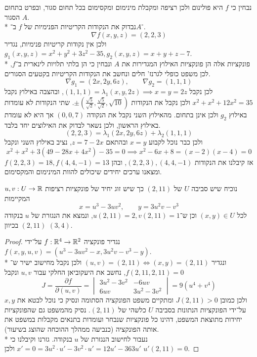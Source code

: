 נבחין כי $f$ היא פולינום ולכן רציפה ומקבלת מינימום ומקסימום בכל תחום סגור, ובפרט בתחום הסגור $A$. \\*
נבדוק את הנקודות הקריטיות הפנימיות של $f$ ב־$A^\circ$.
\[
	\nabla f (x, y, z) = (2, 2, 3)
\]
ולכן אין נקודות קריטיות פנימיות, נגדיר $g_1(x, y, z) = x^2 + y^2 + 3z^2 - 35, g_2(x, y, z) = x + y + z - 7$. \\*
פונקציות אלה הן פונקציות האילוץ המגדירות את $A$ ונבחין כי הן בלתי תלויות לינארית ב־$f$, לכן משפט כופלי לגרנז' חלים ונחשב את הנקודות הקריטיות בקטעים הסגורים.
\[
	\nabla g_1 = (2x, 2y, 6z),
	\qquad
	\nabla g_2 = (1, 1, 1)
\]
לכן נקבל $(1, 1, 1) = \lambda_1 (x, y, 2z) \implies x = y = 2z$, ובהצבה באילוץ נקבל $x^2 + x^2 + 12x^2 = 35$ ולכן נקבל את הנקודות $\pm(\frac{\sqrt{5}}{\sqrt{2}}, \frac{\sqrt{5}}{\sqrt{2}}, \sqrt{10})$.
שתי הנקודות לא עומדות באילוץ $g_2$ ולכן אינן בתחום.
מהאילוץ השני נקבל את הנקודה $(0, 0, 7)$ אך היא לא עומדת באילוץ הראשון, ולכן נשאר לבדוק את האילוצים יחד בלבד.
\[
	(2, 2, 3) = \lambda_1 (2x, 2y, 6z) + \lambda_2 (1, 1, 1)
\]
ולכן כבר נוכל לקבוע $x = y$ ובהתאם $z = 7 - 2x$, נציב באילוץ השני ונקבל
\[
	x^2 + x^2 + 3(49 - 28x + 4x^2) - 35 = 0
	\implies
	x^2 - 6x + 8 = (x - 2)(x - 4) = 0
\]
אז קיבלנו את הנקודות $(2, 2, 3), (4, 4, -1)$, ובהן $f(2, 2, 3) = 18, f(4, 4, -1) = 13$ ומצאנו ערכים יחידים שיכולים להוות המינימום והמקסימום.

\Question{}
נוכיח שיש סביבה $U$ של $(2, 11)$ כך שיש זוג יחיד של פונקציות רציפות $u, v : U \to \mathbb{R}$ המקיימות
\[
	x = u^3 - 3 u v^2,
	\qquad
	y = 3u^2 v - v^3
\]
לכל $(x, y) \in U$ וכן ש־$u(2, 11) = 2, v(2, 11) = 1$, ונמצא את הנגזרת של $u$ בנקודה $(2, 11)$ בכיוון $(3, 4)$.
\begin{proof}
	נגדיר פונקציה $f : \mathbb{R}^{4} \to \mathbb{R}^2$ על־ידי $f(x, y, u, v) = (u^3 - 3uv^2 - x, 3u^2 v - v^3 - y)$. \\*
	ונגדיר $(u, v) = (2, 11) \iff (x, y) = (2, 11)$ ולכן נקבל מחישוב ישיר ש־$f(2, 11, 2, 11) = 0$, נחשב את היעקוביאן החלקי עבור $u, v$ ונקבל
	\[
		J = \frac{\partial f}{\partial (u, v)}
		= \begin{vmatrix}
			3u^2 - 3v^2 & -6uv \\
			6uv & 3u^2 - 3v^2
		\end{vmatrix}
		= 9(u^4 + v^4)
	\]
	ולכן כמובן $J(2, 11) > 0$ ומתקיים משפט הפונקציה הסתומה ונסיק כי נוכל לבטא את $x, y$ על־ידי הפונקציות הנתונות בסביבה $U$ כלשהי של $(2, 11)$.
	נסיק מהמשפט גם שהפונקציות יחידות מתוצאת המשפט, דהינו כל פונקציות שנבחר ועומדות בתנאים מקבלות במשפט את אותה הפונקציה (כנביעה ממהלך ההוכחה שהוצג בשיעור). \\*
	נעבור לחישוב הנגזרת של $u$ בנקודה.
	גזרנו וקיבלנו כי $x' = 0 = 3u^2 \cdot u' - 3v^2 \cdot u' = 12 u' - 363 u'$ ולכן $u'(2, 11) = 0$.
\end{proof}


